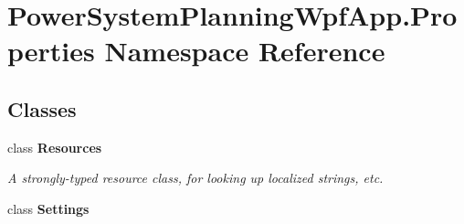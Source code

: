 \hypertarget{namespace_power_system_planning_wpf_app_1_1_properties}{}\section{Power\+System\+Planning\+Wpf\+App.\+Properties Namespace Reference}
\label{namespace_power_system_planning_wpf_app_1_1_properties}
\subsection*{Classes}
\begin{DoxyCompactItemize}
\item 
class {\bfseries Resources}
\begin{DoxyCompactList}\small\item\em A strongly-\/typed resource class, for looking up localized strings, etc. \end{DoxyCompactList}\item 
class {\bfseries Settings}
\end{DoxyCompactItemize}

